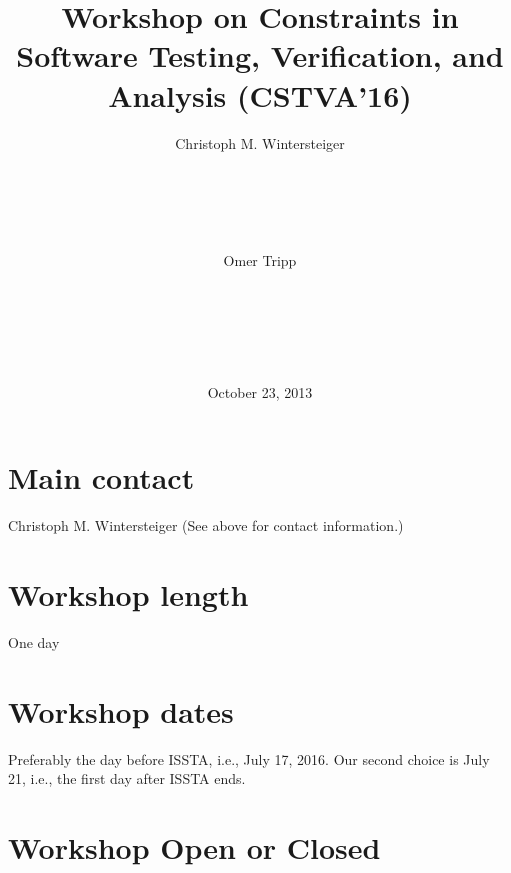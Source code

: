 \documentclass{sig-alternate}
\begin{document}
\title{Workshop on Constraints in Software Testing, Verification, and
  Analysis (CSTVA'16)}


\author{
  Christoph M. Wintersteiger\\
  \\
  \\
  \\
  \\
  \\
  \alignauthor
  Omer Tripp\\
  \\
  \\
  \\
  \\
  \\
}
\date{October 23, 2013}

\maketitle
\toappear{}

\section{Main contact}

Christoph M. Wintersteiger (See above for contact information.)

\section{Workshop length}

One day

\section{Workshop dates}

Preferably the day before ISSTA, i.e., July 17, 2016. Our second choice is July
21, i.e., the first day after ISSTA ends. 

\section{Workshop Open or Closed}
\end{document}
